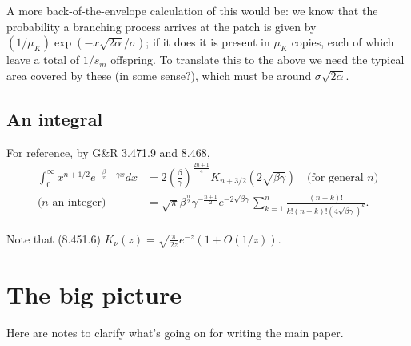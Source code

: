 \documentclass{article}
\begin{document}
A more back-of-the-envelope calculation of this would be:
we know that the probability a branching process arrives at the patch is given by $(1/\mu_K)\exp(-x\sqrt{2 \alpha}/\sigma)$;
if it does it is present in $\mu_K$ copies, each of which leave a total of $1/s_m$ offspring.
To translate this to the above we need the typical area covered by these (in some sense?), 
which must be around $\sigma \sqrt{2 \alpha}$.

\subsection{An integral}

For reference, by G\&R 3.471.9 and 8.468,
\begin{align}
  \int_0^\infty x^{n+1/2} e^{-\frac{\beta}{x}-\gamma x} dx &= 2 \left( \frac{\beta}{\gamma} \right)^{\frac{2n+1}{4}} K_{n+3/2}(2\sqrt{\beta\gamma}) \quad \mbox{(for general $n$)} \\
  \mbox{($n$ an integer)} \quad &= \sqrt{\pi} \beta^{\frac{n}{2}} \gamma^{-\frac{n+1}{2}} e^{-2\sqrt{\beta\gamma}} \sum_{k=1}^n \frac{ (n+k)! }{ k! (n-k)! (4\sqrt{\beta \gamma})^k } .
\end{align}

Note that (8.451.6) $K_\nu(z) = \sqrt{\frac{\pi}{2z}} e^{-z} (1 + O(1/z))$.

\section{The big picture}

Here are notes to clarify what's going on for writing the main paper.
\end{document}
